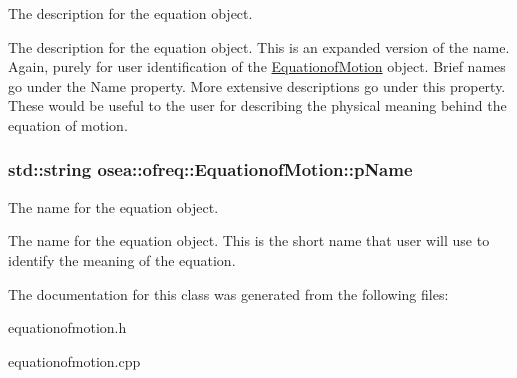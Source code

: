 The description for the equation object. 

The description for the equation object. This is an expanded version of the name. Again, purely for user identification of the \hyperlink{classosea_1_1ofreq_1_1_equationof_motion}{Equationof\-Motion} object. Brief names go under the Name property. More extensive descriptions go under this property. These would be useful to the user for describing the physical meaning behind the equation of motion. \hypertarget{classosea_1_1ofreq_1_1_equationof_motion_a5848a1ad14d31556fd1b62b4e3de3643}{
\subsubsection[{p\-Name}]{\setlength{\rightskip}{0pt plus 5cm}std\-::string osea\-::ofreq\-::\-Equationof\-Motion\-::p\-Name\hspace{0.3cm}{\ttfamily [protected]}}}\label{classosea_1_1ofreq_1_1_equationof_motion_a5848a1ad14d31556fd1b62b4e3de3643}


The name for the equation object. 

The name for the equation object. This is the short name that user will use to identify the meaning of the equation. 

The documentation for this class was generated from the following files\-:\begin{DoxyCompactItemize}
\item 
equationofmotion.\-h\item 
equationofmotion.\-cpp\end{DoxyCompactItemize}
